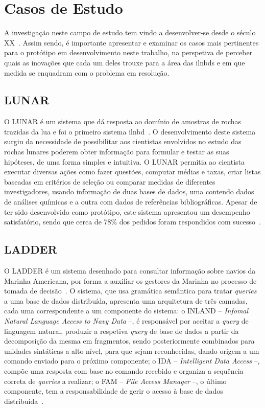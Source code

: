 \section{Casos de Estudo}
\label{sec:chap03_marketstudy}
A investigação neste campo de estudo tem vindo a desenvolver-se desde o século XX~\parencite{survey_nlidb}. Assim sendo, é importante apresentar e examinar os casos mais pertinentes para o protótipo em desenvolvimento neste trabalho, na perspetiva de perceber quais as inovações que cada um deles trouxe para a área das \glspl{ilnbd} e em que medida se enquadram com o problema em resolução.

\subsection{LUNAR}
O LUNAR é um sistema que dá resposta ao domínio de amostras de rochas trazidas da lua e foi o primeiro sistema \gls{ilnbd}~\parencite{nlidb_brief_review, survey_nlidb}. O desenvolvimento deste sistema surgiu da necessidade de possibilitar aos cientistas envolvidos no estudo das rochas lunares poderem obter informação para formular e testar as suas hipóteses, de uma forma simples e intuitiva. O LUNAR permitia ao cientista executar diversas ações como fazer questões, computar médias e taxas, criar listas baseadas em critérios de seleção ou comparar medidas de diferentes investigadores, usando informação de duas bases de dados, uma contendo dados de análises químicas e a outra com dados de referências bibliográficas. Apesar de ter sido desenvolvido como protótipo, este sistema apresentou um desempenho satisfatório, sendo que cerca de 78\% dos pedidos foram respondidos com sucesso~\parencite{lunar_sciences_nlis}.

\subsection{LADDER}
O LADDER é um sistema desenhado para consultar informação sobre navios da Marinha Americana, por forma a auxiliar os gestores da Marinha no processo de tomada de decisão~\parencite{nlidb_brief_review, developing_nli_complex_data}. O sistema, que usa gramática semântica para tratar \textit{queries} a uma base de dados distribuída, apresenta uma arquitetura de três camadas, cada uma correspondente a um componente do sistema: o INLAND -- \textit{Infomal Natural Language Access to Navy Data} --, é responsável por aceitar a \textit{query} de linguagem natural, produzir a respetiva \textit{query} de base de dados a partir da decomposição da mesma em fragmentos, sendo posteriormente combinados para unidades sintáticas a alto nível, para que sejam reconhecidas, dando origem a um comando enviado para o próximo componente; o IDA -- \textit{Intelligent Data Access} --, compõe uma resposta com base no comando recebido e organiza a sequência correta de \textit{queries} a realizar; o FAM -- \textit{File Access Manager} --, o último componente, tem a responsabilidade de gerir o acesso à base de dados distribuída~\parencite{developing_nli_complex_data}.

